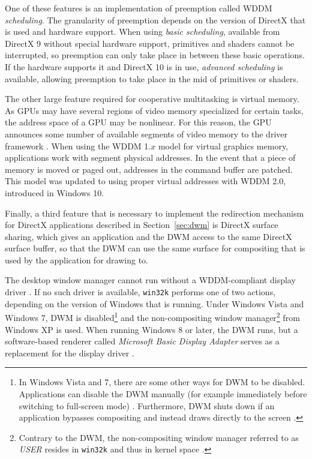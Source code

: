 			One of these features is an implementation of preemption called
			WDDM \emph{scheduling}. The granularity of preemption depends on
			the version of DirectX that is used and hardware support. When
			using \emph{basic scheduling}, available from DirectX 9 without
			special hardware support, primitives and shaders cannot be interrupted,
			so preemption can only take place in between these basic operations.
			If the hardware supports it and DirectX 10 is in use, \emph{advanced
			scheduling} is available, allowing preemption to take place in the mid
			of primitives or shaders. \cite{dwmwddm}

			The other large feature required for cooperative multitasking is
			virtual memory. As GPUs may have several regions of video memory
			specialized for certain tasks, the address space of a GPU may
			be nonlinear. For this reason, the GPU announces some number of
			available segments of video memory to the driver framework \cite{gpuseg}.
			When using the WDDM 1.$x$ model for virtual graphics
			memory, applications work with segment physical addresses. In the event
			that a piece of memory is moved or paged out, addresses in the command
			buffer are patched. This model was updated to using proper virtual
			addresses with WDDM 2.0, introduced in Windows 10. \cite{wddm2}

			Finally, a third feature that is necessary to implement the redirection
			mechanism for DirectX applications described in Section~\ref{sec:dwm}
			is DirectX surface sharing, which gives an application and the DWM
			access to the same DirectX surface buffer, so that the DWM can use the
			same surface for compositing that is used by the application for
			drawing to. \cite{dwmredirect}

			The desktop window manager cannot run without a WDDM-compliant
			display driver \cite{dwmwddm}. If no such driver is available,
			\texttt{win32k} \cite{probertwin32k} performs one of two actions, depending on the version of Windows that
			is running. Under Windows Vista and Windows 7, DWM is
			disabled\footnote{In Windows Vista and 7, there are some other ways for
			DWM to be disabled. Applications can disable the DWM manually (for
			example immediately before switching to full-screen mode)
			\cite{disabledwm}. Furthermore, DWM shuts down if an application
			bypasses compositing and instead draws directly to the screen
			\cite{dwmredirect}.}
			and the non-compositing window manager\footnote{Contrary to the DWM,
			the non-compositing window manager referred to as \textit{USER} resides
			in \texttt{win32k} and thus in kernel space \cite{probertwin32k}.}
			from Windows XP is used. When running Windows 8 or later,
			the DWM runs, but a software-based renderer called
			\textit{Microsoft Basic Display Adapter} serves as a replacement
			for the display driver \cite{dwmalwayson}.

